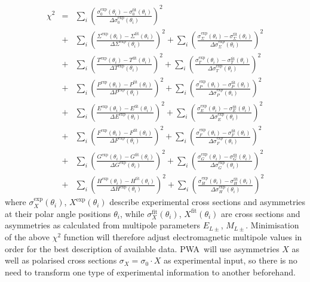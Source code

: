 \documentclass[a4paper,10pt]{article}
\def\PWA{\ttfamily PWA\rmfamily\ }
\begin{document}
\begin{displaymath}
\begin{array}{lcl}
\chi^2
&=& \sum\limits_i \left(
\frac
{\sigma_0^\mathrm{exp}(\theta_i) - \sigma_0^\mathrm{fit}(\theta_i)}
{\Delta \sigma_0^\mathrm{exp}(\theta_i)}
\right)^2\\
&+& \sum\limits_i \left(
\frac
{\Sigma^\mathrm{exp}(\theta_i) - \Sigma^\mathrm{fit}(\theta_i)}
{\Delta \Sigma^\mathrm{exp}(\theta_i)}
\right)^2
+ \sum\limits_i \left(
\frac
{\sigma_\Sigma^\mathrm{exp}(\theta_i) - \sigma_\Sigma^\mathrm{fit}(\theta_i)}
{\Delta \sigma_\Sigma^\mathrm{exp}(\theta_i)}
\right)^2\\
&+& \sum\limits_i \left(
\frac
{T^\mathrm{exp}(\theta_i) - T^\mathrm{fit}(\theta_i)}
{\Delta T^\mathrm{exp}(\theta_i)}
\right)^2
+ \sum\limits_i \left(
\frac
{\sigma_T^\mathrm{exp}(\theta_i) - \sigma_T^\mathrm{fit}(\theta_i)}
{\Delta \sigma_T^\mathrm{exp}(\theta_i)}
\right)^2\\
&+& \sum\limits_i \left(
\frac
{P^\mathrm{exp}(\theta_i) - P^\mathrm{fit}(\theta_i)}
{\Delta P^\mathrm{exp}(\theta_i)}
\right)^2
+ \sum\limits_i \left(
\frac
{\sigma_P^\mathrm{exp}(\theta_i) - \sigma_P^\mathrm{fit}(\theta_i)}
{\Delta \sigma_P^\mathrm{exp}(\theta_i)}
\right)^2\\
&+& \sum\limits_i \left(
\frac
{E^\mathrm{exp}(\theta_i) - E^\mathrm{fit}(\theta_i)}
{\Delta E^\mathrm{exp}(\theta_i)}
\right)^2
+ \sum\limits_i \left(
\frac
{\sigma_E^\mathrm{exp}(\theta_i) - \sigma_E^\mathrm{fit}(\theta_i)}
{\Delta \sigma_E^\mathrm{exp}(\theta_i)}
\right)^2\\
&+& \sum\limits_i \left(
\frac
{F^\mathrm{exp}(\theta_i) - F^\mathrm{fit}(\theta_i)}
{\Delta F^\mathrm{exp}(\theta_i)}
\right)^2
+ \sum\limits_i \left(
\frac
{\sigma_F^\mathrm{exp}(\theta_i) - \sigma_F^\mathrm{fit}(\theta_i)}
{\Delta \sigma_F^\mathrm{exp}(\theta_i)}
\right)^2\\
&+& \sum\limits_i \left(
\frac
{G^\mathrm{exp}(\theta_i) - G^\mathrm{fit}(\theta_i)}
{\Delta G^\mathrm{exp}(\theta_i)}
\right)^2
+ \sum\limits_i \left(
\frac
{\sigma_G^\mathrm{exp}(\theta_i) - \sigma_G^\mathrm{fit}(\theta_i)}
{\Delta \sigma_G^\mathrm{exp}(\theta_i)}
\right)^2\\
&+& \sum\limits_i \left(
\frac
{H^\mathrm{exp}(\theta_i) - H^\mathrm{fit}(\theta_i)}
{\Delta H^\mathrm{exp}(\theta_i)}
\right)^2
+ \sum\limits_i \left(
\frac
{\sigma_H^\mathrm{exp}(\theta_i) - \sigma_H^\mathrm{fit}(\theta_i)}
{\Delta \sigma_H^\mathrm{exp}(\theta_i)}
\right)^2
\end{array}
\end{displaymath}
where $\sigma_X^\mathrm{exp}(\theta_i)$, $X^\mathrm{exp}(\theta_i)$ describe experimental cross sections and asymmetries
at their polar angle positions $\theta_i$, while 
$\sigma_X^\mathrm{fit}(\theta_i)$, $X^\mathrm{fit}(\theta_i)$ are cross sections and asymmetries as calculated from
multipole parameters $E_{L\pm}$, $M_{L\pm}$.
Minimisation of the above $\chi^2$ function will therefore adjust electromagnetic multipole values in order for the best description
of available data.
\PWA will use asymmetries $X$ as well as polarised cross sections $\sigma_X = \sigma_0\cdot X$ as experimental input,
so there is no need to transform one type of experimental information to another beforehand.
\end{document}

